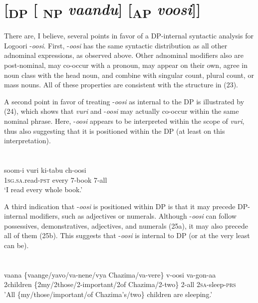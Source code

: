 \documentclass[output=paper]{langsci/langscibook}
\begin{document}
\chapter[      [DP [ NP vaandu{]} [AP voosi{]}{]}]{      [\textsubscript{DP} [\textsubscript{ NP} \textit{vaandu}] [\textsubscript{AP }\textit{voosi}]]}

  There are, I believe, several points in favor of a DP-internal syntactic analysis for Logoori -\textit{oosi}. First, -\textit{oosi} has the same syntactic distribution as all other adnominal expressions, as observed above. Other adnominal modifiers also are post-nominal, may co-occur with a pronoun, may appear on their own, agree in noun class with the head noun, and combine with singular count, plural count, or mass nouns. All of these properties are consistent with the structure in (23). 

  A second point in favor of treating -\textit{oosi} as internal to the DP is illustrated by (24), which shows that \textit{vuri} and -\textit{oosi} may actually co-occur within the same nominal phrase. Here, -\textit{oosi} appears to be interpreted within the scope of \textit{vuri}, thus also suggesting that it is positioned within the DP (at least on this interpretation).

\chapter[  ]{  }
\gll soom-i      vuri    ki-tabu  ch-oosi\\
     1\textsc{sg.sa}.read-\textsc{pst  }every    7-book  7-all \\
\glt ‘I read every whole book.’
\z

  A third indication that -\textit{oosi} is positioned within DP is that it may precede DP-internal modifiers, such as adjectives or numerals. Although -\textit{oosi} can follow possessives, demonstratives, adjectives, and numerals (25a), it may also precede all of them (25b). This suggests that -\textit{oosi} is internal to DP (or at the very least can be). 

\chapter[  ]{\textit{  }}
\chapter{}
\gll vaana  \textup{\{}vaange\textup{/}yavo\textup{/}va-nene/vya Chazima/va-vere\}  v-oosi  va-gon-aa\\
     2children  \{2my/2those/2-important/2of Chazima/2-two\}  2-all  2\textsc{sa}{}-sleep-\textsc{prs}\\
\glt 'All \{my/those/important/of Chazima's/two\} children are sleeping.'  
\z
\end{document}
